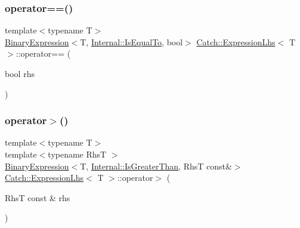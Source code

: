 \subsubsection{\texorpdfstring{operator==()}{operator==()}\hspace{0.1cm}{\footnotesize\ttfamily [2/2]}}
{\footnotesize\ttfamily template$<$typename T$>$ \\
\mbox{\hyperlink{class_catch_1_1_binary_expression}{Binary\+Expression}}$<$T, \mbox{\hyperlink{namespace_catch_1_1_internal_ae3f96598a7858155750bf38e7295d83ea30e0accba6ec8384f4383b04dd2a6a9e}{Internal\+::\+Is\+Equal\+To}}, bool$>$ \mbox{\hyperlink{class_catch_1_1_expression_lhs}{Catch\+::\+Expression\+Lhs}}$<$ T $>$\+::operator== (\begin{DoxyParamCaption}\item[{bool}]{rhs }\end{DoxyParamCaption})\hspace{0.3cm}{\ttfamily [inline]}}

\mbox{\label{class_catch_1_1_expression_lhs_a52981d92ec6aad872660ae7df1abb33a}} 
\subsubsection{\texorpdfstring{operator$>$()}{operator>()}}
{\footnotesize\ttfamily template$<$typename T$>$ \\
template$<$typename RhsT $>$ \\
\mbox{\hyperlink{class_catch_1_1_binary_expression}{Binary\+Expression}}$<$T, \mbox{\hyperlink{namespace_catch_1_1_internal_ae3f96598a7858155750bf38e7295d83eac0e8866139e99803d169595af70f6c22}{Internal\+::\+Is\+Greater\+Than}}, RhsT const\&$>$ \mbox{\hyperlink{class_catch_1_1_expression_lhs}{Catch\+::\+Expression\+Lhs}}$<$ T $>$\+::operator$>$ (\begin{DoxyParamCaption}\item[{RhsT const \&}]{rhs }\end{DoxyParamCaption})\hspace{0.3cm}{\ttfamily [inline]}}

\mbox{\label{class_catch_1_1_expression_lhs_a3387a494cb6b699a6c0162c79f7f533c}} 
